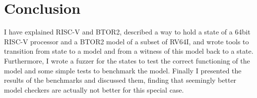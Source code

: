 \chapter{Conclusion}
I have explained RISC-V and BTOR2, described a way to hold a state of
a 64bit RISC-V processor and a BTOR2 model of a subset of RV64I, and
wrote tools to transition from state to a model and from a witness of
this model back to a state. Furthermore, I wrote a fuzzer for the
states to test the correct functioning of the model and some simple
tests to benchmark the model. Finally I presented the results of the
benchmarks and discussed them, finding that seemingly better model
checkers are actually not better for this special case.
